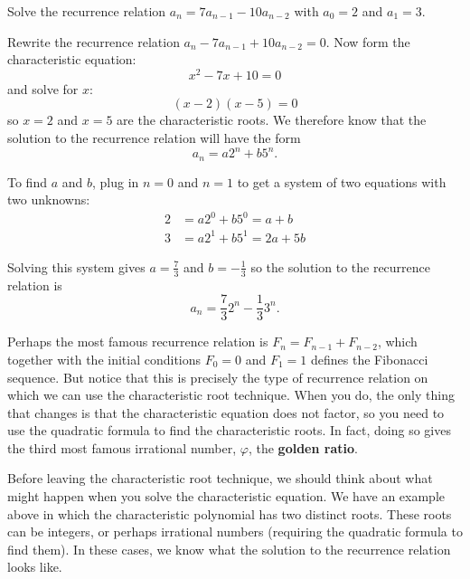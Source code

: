 \documentclass[11pt,]{book}
\newcommand{\terminology}[1]{\textbf{#1}}
\theoremstyle{ptxplainnotitle}
\theoremstyle{ptxplaintitle}
\theoremstyle{ptxdefinitionnotitle}
\theoremstyle{ptxdefinitiontitle}
\theoremstyle{ptxdefinitionnotitle}
\theoremstyle{ptxdefinitiontitle}
\theoremstyle{ptxdefinitionnotitle}
\theoremstyle{ptxdefinitiontitle}
\theoremstyle{ptxdefinitiontitlenonumber}
\theoremstyle{ptxdefinitiontitlenonumber}
\numberwithin{equation}{chapter}
\newcommand{\amp}{&}
\begin{document}
\begin{example}\label{example-23}
\hypertarget{p-460}{}%
Solve the recurrence relation \(a_n = 7a_{n-1} - 10 a_{n-2}\) with \(a_0 = 2\) and \(a_1 = 3\).%
\par\smallskip%
\noindent\textbf{}\hypertarget{solution-69}{}\hypertarget{p-461}{}%
Rewrite the recurrence relation \(a_n - 7a_{n-1} + 10a_{n-2} = 0\). Now form the characteristic equation:%
\begin{equation*}
x^2 - 7x + 10 = 0
\end{equation*}
and solve for \(x\):%
\begin{equation*}
(x - 2) (x - 5) = 0
\end{equation*}
so \(x = 2\) and \(x = 5\) are the characteristic roots. We therefore know that the solution to the recurrence relation will have the form%
\begin{equation*}
a_n = a 2^n + b 5^n.
\end{equation*}
%
\par
\hypertarget{p-462}{}%
To find \(a\) and \(b\), plug in \(n =0\) and \(n = 1\) to get a system of two equations with two unknowns:%
\begin{align*}
2 \amp = a 2^0 + b 5^0 = a + b\\
3 \amp = a 2^1 + b 5^1 = 2a + 5b
\end{align*}
%
\par
\hypertarget{p-463}{}%
Solving this system gives \(a = \frac{7}{3}\) and \(b = -\frac{1}{3}\) so the solution to the recurrence relation is%
\begin{equation*}
a_n = \frac{7}{3}2^n - \frac{1}{3} 3^n.
\end{equation*}
%
\end{example}
\hypertarget{p-464}{}%
Perhaps the most famous recurrence relation is \(F_n = F_{n-1} + F_{n-2}\), which together with the initial conditions \(F_0 = 0\) and \(F_1= 1\) defines the Fibonacci sequence. But notice that this is precisely the type of recurrence relation on which we can use the characteristic root technique. When you do, the only thing that changes is that the characteristic equation does not factor, so you need to use the quadratic formula to find the characteristic roots. In fact, doing so gives the third most famous irrational number, \(\varphi\), the \terminology{golden ratio}.%
\par
\hypertarget{p-465}{}%
Before leaving the characteristic root technique, we should think about what might happen when you solve the characteristic equation. We have an example above in which the characteristic polynomial has two distinct roots. These roots can be integers, or perhaps irrational numbers (requiring the quadratic formula to find them). In these cases, we know what the solution to the recurrence relation looks like.%
\end{document}
